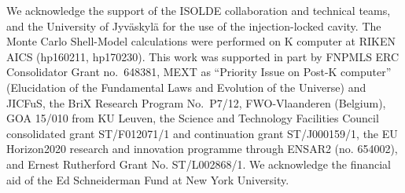 \documentclass[reprint,superscriptaddress,amsmath,amssymb,aps,prl]{revtex4-1}
\begin{document}
\begin{acknowledgments}
We acknowledge the support of the ISOLDE collaboration and technical teams, and the University of Jyv\"{a}skyl\"{a} for the use of the injection-locked cavity. The Monte Carlo Shell-Model calculations were performed on K computer at RIKEN AICS (hp160211, hp170230). This work was supported in part by FNPMLS ERC Consolidator Grant no.~648381, MEXT as ``Priority Issue on Post-K computer'' (Elucidation of the Fundamental Laws and Evolution of the Universe) and JICFuS, the BriX Research Program No.~P7/12, FWO-Vlaanderen (Belgium), GOA 15/010 from KU Leuven, the Science and Technology Facilities Council consolidated grant ST/F012071/1 and continuation grant ST/J000159/1, the EU Horizon2020 research and innovation programme through ENSAR2 (no. 654002), and Ernest Rutherford Grant No. ST/L002868/1. We acknowledge the financial aid of the Ed Schneiderman Fund at New York University.
\end{acknowledgments}


\end{document}
